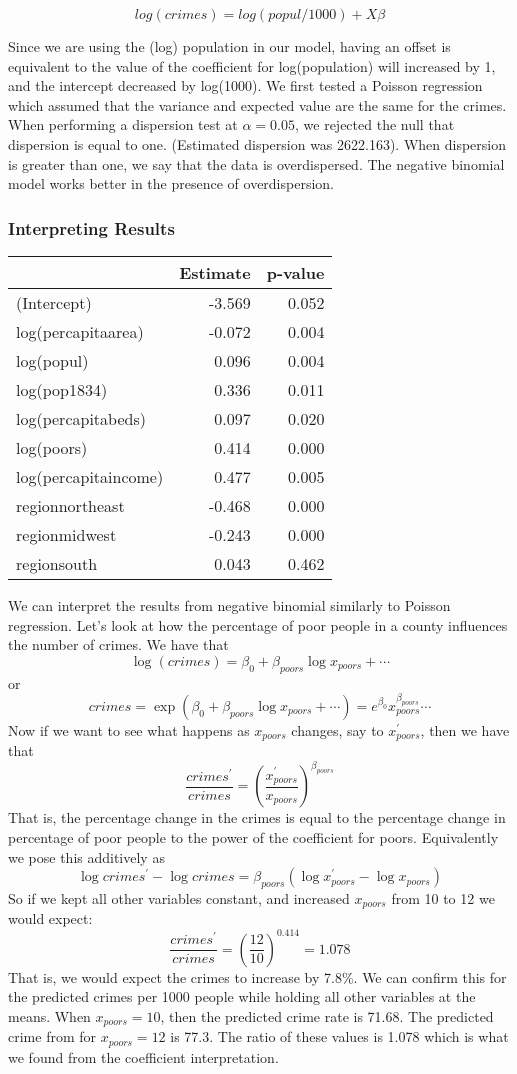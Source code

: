 \documentclass[]{article}
\begin{document}
\[
log(crimes) = log(popul/1000) + X\beta
\]

Since we are using the (log) population in our model, having an offset
is equivalent to the value of the coefficient for log(population) will
increased by 1, and the intercept decreased by log(1000). We first
tested a Poisson regression which assumed that the variance and expected
value are the same for the crimes. When performing a dispersion test at
\(\alpha = 0.05\), we rejected the null that dispersion is equal to one.
(Estimated dispersion was 2622.163). When dispersion is greater than
one, we say that the data is overdispersed. The negative binomial model
works better in the presence of overdispersion.

\subsubsection{Interpreting Results}\label{interpreting-results}

\begin{longtable}[]{@{}lrr@{}}
\toprule
& Estimate & p-value\tabularnewline
\midrule
\endhead
(Intercept) & -3.569 & 0.052\tabularnewline
log(percapitaarea) & -0.072 & 0.004\tabularnewline
log(popul) & 0.096 & 0.004\tabularnewline
log(pop1834) & 0.336 & 0.011\tabularnewline
log(percapitabeds) & 0.097 & 0.020\tabularnewline
log(poors) & 0.414 & 0.000\tabularnewline
log(percapitaincome) & 0.477 & 0.005\tabularnewline
regionnortheast & -0.468 & 0.000\tabularnewline
regionmidwest & -0.243 & 0.000\tabularnewline
regionsouth & 0.043 & 0.462\tabularnewline
\bottomrule
\end{longtable}

We can interpret the results from negative binomial similarly to Poisson
regression. Let's look at how the percentage of poor people in a county
influences the number of crimes. We have that \[
\log(crimes) = \beta_0 + \beta_{poors} \log x_{poors} + \cdots
\] or \[
crimes = \exp(\beta_0 + \beta_{poors} \log x_{poors}  + \cdots) = e^{\beta_0} x_{poors}^{\beta_{poors}} \cdots
\] Now if we want to see what happens as \(x_{poors}\) changes, say to
\(x_{poors}^{\prime}\), then we have that \[
\frac{crimes^{\prime}}{crimes} = \left(\frac{x_{poors}^{\prime}}{x_{poors}}\right)^{\beta_{poors}}
\] That is, the percentage change in the crimes is equal to the
percentage change in percentage of poor people to the power of the
coefficient for poors. Equivalently we pose this additively as \[
\log crimes^{\prime} - \log crimes = \beta_{poors} \left( \log x_{poors}^{\prime} - \log x_{poors} \right)
\] So if we kept all other variables constant, and increased
\(x_{poors}\) from 10 to 12 we would expect: \[
\frac{crimes^{\prime}}{crimes} = \left(\frac{12}{10} \right)^{0.414} = 1.078
\] That is, we would expect the crimes to increase by 7.8\%. We can
confirm this for the predicted crimes per 1000 people while holding all
other variables at the means. When \(x_{poors} = 10\), then the
predicted crime rate is 71.68. The predicted crime from for
\(x_{poors} = 12\) is 77.3. The ratio of these values is 1.078 which is
what we found from the coefficient interpretation.
\end{document}
